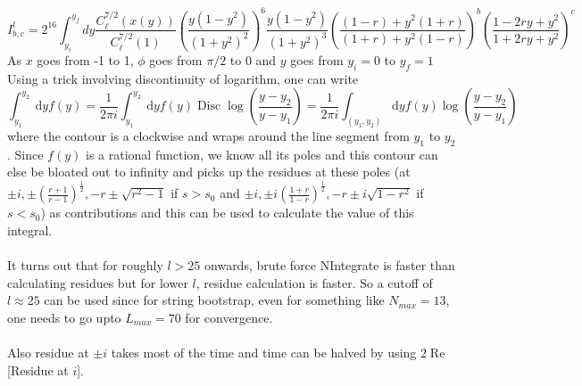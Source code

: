 ﻿\documentclass[12pt,a4paper]{article}
\begin{document}
$$
I_{b, c}^{l}=2^{16} \int_{y_{i}}^{y_{f}} d y \frac{C^{7/2}_{\ell}(x(y))}{C^{7/2}_{\ell}(1)}\left(\frac{y(1-y^{2})}{(1+y^{2})^{2}} \right)^{6} \frac{y\left(1-y^{2}\right)}{\left(1+y^{2}\right)^{3}}\left(\frac{(1-r)+y^{2}(1+r)}{(1+r)+y^{2}(1-r)}\right)^{b}\left(\frac{1-2 r y+y^{2}}{1+2 r y+y^{2}}\right)^{c}
$$
As $x$ goes from -1 to 1, $\phi$ goes from $\pi/2$ to $0$ and $y$ goes from $y_{i}=0$ to $y_{f}=1$
Using a trick involving discontinuity of logarithm, one can write
$$
\int_{y_{1}}^{y_{2}} \mathrm{~d} y f(y)=\frac{1}{2 \pi i} \int_{y_{1}}^{y_{2}} \mathrm{~d} y f(y) \operatorname{Disc} \log \left(\frac{y-y_{2}}{y-y_{1}}\right)=\frac{1}{2 \pi i} \int_{\left(y_{1}, y_{2}\right)} \mathrm{d} y f(y) \log \left(\frac{y-y_{2}}{y-y_{1}}\right)
$$
where the contour is a clockwise and wraps around the line segment from $y_{1}$ to $y_{2}$. Since $f(y)$ is a rational function, we know all its poles and this contour can else be bloated out to infinity and picks up the residues at these poles (at $\pm i, \pm\left(\frac{r+1}{r-1}\right)^{\frac{1}{2}},-r \pm \sqrt{r^{2}-1}$ if $s>s_{0}$ and $\pm i, \pm i\left(\frac{1+r}{1-r}\right)^{\frac{1}{2}},-r \pm i\sqrt{1-r^{2}}$ if $s<s_{0}$) as contributions and this can be used to calculate the value of this integral.\\\\
It turns out that for roughly $l>25$ onwards, brute force NIntegrate is faster than calculating residues but for lower $l$, residue calculation is faster. So a cutoff of $l \approx 25$ can be used since for string bootstrap, even for something like $N_{max}=13$, one needs to go upto $L_{max}=70$ for convergence.\\\\
Also residue at $\pm i$ takes most of the time and time can be halved by using $2\operatorname{Re}$[Residue at $i$].



















\end{document}
